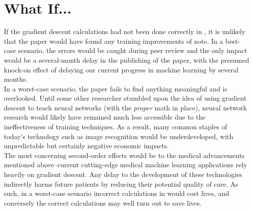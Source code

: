 \documentclass[11pt, a4paper]{article}
\begin{document}
\section{What If...}

If the gradient descent calculations had not been done correctly in \cite{lecun}, it is unlikely that the paper would have found any training
improvements of note. In a best-case scenario, the errors would be caught during peer review and the only impact would be a several-month delay 
in the publishing of the paper, with the presumed knock-on effect of delaying our current progress in machine learning by several months.\\

In a worst-case scenario, the paper fails to find anything meaningful and is overlooked. Until some other researcher stumbled upon the idea of 
using gradient descent to teach neural networks (with the \textit{proper} math in place), neural network research would likely have remained 
much less accessible due to the ineffectiveness of training techniques. As a result, many common staples of today's technology such as image 
recognition would be underdeveloped, with unpredictable but certainly negative economic impacts. \\

The most concerning second-order effects would be to the medical advancements mentioned above--current cutting-edge medical machine learning 
applications rely heavily on gradient descent. Any delay to the development of these technologies indirectly harms future patients by reducing 
their potential quality of care. As such, in a worst-case scenario incorrect calculations in \cite{lecun} would cost lives, and conversely the 
correct calculations may well turn out to save lives.

\newpage



\newpage
\appendix
\end{document}
